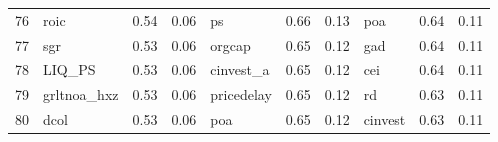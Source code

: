 \documentclass[12pt]{article}
\begin{document}
\begin{landscape}
\begin{footnotesize}
\begin{longtable}{l|lcc|lcc|lcc}
			76                    & roic                        & 0.54                                                                                 & 0.06                            & ps                          & 0.66                                                                                 & 0.13                            & poa                         & 0.64                                                                                 & 0.11                           \\
			77                    & sgr                         & 0.53                                                                                 & 0.06                            & orgcap                      & 0.65                                                                                 & 0.12                            & gad                         & 0.64                                                                                 & 0.11                           \\
			78                    & LIQ\_PS                     & 0.53                                                                                 & 0.06                            & cinvest\_a                  & 0.65                                                                                 & 0.12                            & cei                         & 0.64                                                                                 & 0.11                           \\
			79                    & grltnoa\_hxz                & 0.53                                                                                 & 0.06                            & pricedelay                  & 0.65                                                                                 & 0.12                            & rd                          & 0.63                                                                                 & 0.11                           \\
			80                    & dcol                        & 0.53                                                                                 & 0.06                            & poa                         & 0.65                                                                                 & 0.12                            & cinvest                     & 0.63                                                                                 & 0.11                           \\

\end{longtable}
\end{footnotesize}
\end{landscape}
\end{document}
